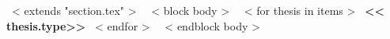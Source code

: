 \vspace{3mm}
~< extends "section.tex" >~
~< block body >~
~< for thesis in items >~
{\bf << thesis.type>>} \newline
\hspace*{1em} 
\hspace*{1em} 
~< endfor >~
~< endblock body >~
